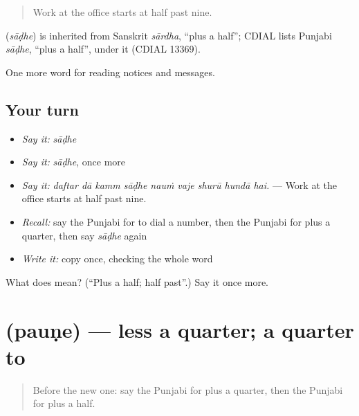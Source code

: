 \begin{quote}
Work at the office starts at half past nine.
\end{quote}

\begin{cousinweb}
\textbf{} (\emph{sāḍhe}) is inherited from Sanskrit \emph{sārdha}, \textquotedblleft{}plus a half\textquotedblright{}; CDIAL lists Punjabi \emph{sāḍhe}, \textquotedblleft{}plus a half\textquotedblright{}, under it (CDIAL 13369).
\end{cousinweb}

\begin{grammarlens}[title={What you've built}]
One more word for reading notices and messages.
\end{grammarlens}

\subsection*{Your turn}
\begin{itemize}
\raggedright
  \item \emph{Say it:} \emph{sāḍhe}
  \item \emph{Say it:} \emph{sāḍhe}, once more
  \item \emph{Say it:} \emph{daftar dā kamm sāḍhe nauṁ vaje shurū hundā hai.} — Work at the office starts at half past nine.
  \item \emph{Recall:} say the Punjabi for to dial a number, then the Punjabi for plus a quarter, then say \emph{sāḍhe} again
  \item \emph{Write it:} copy \textbf{} once, checking the whole word
\end{itemize}

\begin{tcolorbox}[breakable,colback=teal!4,colframe=teal!35!black,title={Before you move on}]
What does  mean? (\textquotedblleft{}Plus a half; half past\textquotedblright{}.) Say it once more.
\end{tcolorbox}
\section[\texorpdfstring{\pa{ਪੌਣੇ} (pauṇe)}{ਪੌਣੇ (pauṇe)}]{ (pauṇe) — less a quarter; a quarter to}

\label{lesson:PA-C260-paune}



\begin{quote}
Before the new one: say the Punjabi for plus a quarter, then the Punjabi for plus a half.
\end{quote}

